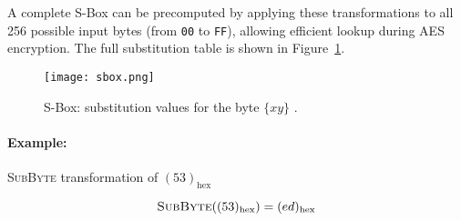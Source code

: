 A complete S-Box can be precomputed by applying these transformations to all 256 possible input bytes (from \texttt{00} to \texttt{FF}), allowing efficient lookup during AES encryption. 
The full substitution table is shown in Figure~\ref{fig:sbox}.

\begin{figure}[!ht]
    \centering
    \texttt{[image: sbox.png]}
    \caption{S-Box: substitution values for the byte $\{xy\}$ \cite{NIST_AES}.}
    \label{fig:sbox}
\end{figure}


\paragraph{Example:} \textsc{SubByte} transformation of $(53)_{\text{hex}}$

\begin{equation}
    \textsc{SubByte}((53)_{\text{hex}}) = (ed)_{\text{hex}}
\end{equation}
